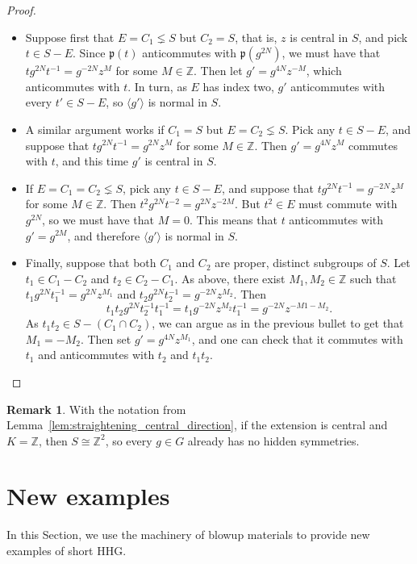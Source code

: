 \documentclass[svgnames]{amsart}
\theoremstyle{plain}
\theoremstyle{definition}
\newtheorem{rem}[thm]{Remark}
\newcommand{\Z}{\mathbb{Z}}
\newcommand{\p}{\mathfrak{p}}
\begin{document}
\begin{proof}
\begin{itemize}
    \item Suppose first that $E=C_1\lneq S$ but $C_2=S$, that is, $z$ is central in $S$, and pick $t\in S-E$. Since $\p(t)$ anticommutes with $\p(g^{2N})$, we must have that $tg^{2N}t^{-1}=g^{-2N}z^{M}$ for some $M\in\mathbb{Z}$. Then let $g'= g^{4N}z^{-M}$, which anticommutes with $t$. In turn, as $E$ has index two, $g'$ anticommutes with every $t'\in S-E$, so $\langle g'\rangle$ is normal in $S$.
    \item A similar argument works if $C_1= S$ but $E=C_2\lneq S$. Pick any $t\in S-E$, and suppose that $tg^{2N}t^{-1}=g^{2N}z^{M}$ for some $M\in\mathbb{Z}$. Then $g'= g^{4N}z^{M}$ commutes with $t$, and this time $g'$ is central in $S$.
    \item If $E=C_1=C_2\lneq S$, pick any $t\in S-E$, and suppose that $tg^{2N}t^{-1}=g^{-2N}z^{M}$ for some $M\in\mathbb{Z}$. Then $t^2g^{2N}t^{-2}=g^{2N}z^{-2M}$. But $t^2\in E$ must commute with $g^{2N}$, so we must have that $M=0$. This means that $t$ anticommutes with $g'=g^{2M}$, and therefore $\langle g'\rangle$ is normal in $S$.
    \item Finally, suppose that both $C_1$ and $C_2$ are proper, distinct subgroups of $S$. Let $t_1\in C_1-C_2$ and $t_2\in C_2-C_1$. As above, there exist $M_1,M_2\in\Z$ such that $t_1g^{2N}t_1^{-1}=g^{2N}z^{M_1}$ and $t_2g^{2N}t_2^{-1}=g^{-2N}z^{M_2}$. Then
    $$t_1t_2g^{2N}t_2^{-1}t_1^{-1}=t_1g^{-2N}z^{M_2}t_1^{-1}=g^{-2N}z^{-M1-M_2}.$$
    As $t_1t_2\in S-(C_1\cap C_2)$, we can argue as in the previous bullet to get that $M_1=-M_2$. Then set $g'=g^{4N}z^{M_1}$, and one can check that it commutes with $t_1$ and anticommutes with $t_2$ and $t_1t_2$. \qedhere
\end{itemize}
\end{proof}

\begin{rem}\label{rem:Z=K_central}
    With the notation from Lemma~\ref{lem:straightening_central_direction}, if the extension is central and $K=\Z$, then $S\cong \Z^2$, so every $g\in G$ already has no hidden symmetries.
\end{rem}















\section{New examples}\label{sec:new_examples}
In this Section, we use the machinery of blowup materials to provide new examples of short HHG.
\end{document}
